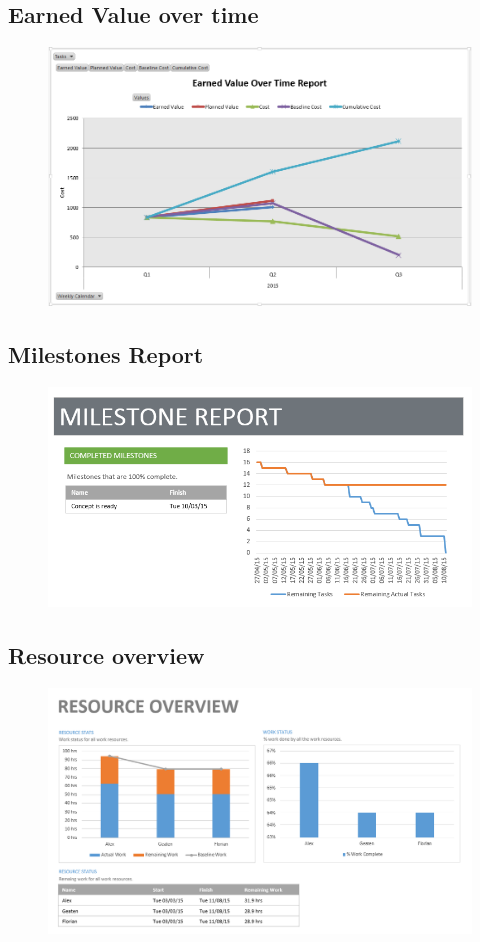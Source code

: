 \documentclass[english]{article}
\begin{document}
\subsection{Earned Value over time}
\begin{figure}[H]
\centerline{\includegraphics[scale=0.8]{FR/ev}}
\end{figure}
\subsection{Milestones Report}
\begin{figure}[H]
\centerline{\includegraphics[scale=1]{FR/ml}}
\end{figure}
\newpage
\subsection{Resource overview}
\begin{figure}[H]
\centerline{\includegraphics[scale=0.8]{FR/resoursec}}
\end{figure}
\end{document}

